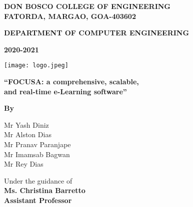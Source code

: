 \begin{titlepage}
    \begin{center}
        \Large
        \textbf{DON BOSCO COLLEGE OF ENGINEERING}\\
        \textbf{FATORDA, MARGAO, GOA-403602}

        \normalsize
        \textbf{DEPARTMENT OF COMPUTER ENGINEERING}\\

        \vspace*{0.4cm}
        
        \large
        \textbf{2020-2021}
        
        \texttt{[image: logo.jpeg]}

        \textbf{“FOCUSA: a comprehensive, scalable,\\
        and real-time e-Learning software”}

        \textbf{By}

        \normalsize
        Mr Yash Diniz\\
        Mr Alston Dias\\
        Mr Pranav Paranjape\\
        Mr Imamsab Bagwan\\
        Mr Rey Dias\\

        \vfill
        
        Under the guidance of\\
        \textbf{Ms. Christina Barretto}\\
        \textbf{Assistant Professor}

    \end{center}
    
\end{titlepage}
